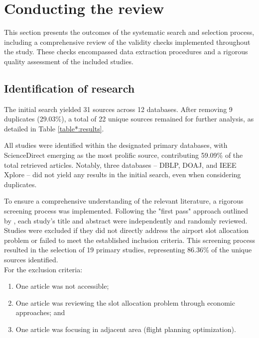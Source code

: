 \section{Conducting the review}
\label{section:Conducting}
This section presents the outcomes of the systematic search and selection process, including a comprehensive review of the validity checks implemented throughout the study. These checks encompassed data extraction procedures and a rigorous quality assessment of the included studies.

\subsection{Identification of research}

The initial search yielded 31 sources across 12 databases. After removing 9 duplicates (29.03\%), a total of 22 unique sources remained for further analysis, as detailed in Table \ref{table*:results}.



All studies were identified within the designated primary databases, with ScienceDirect emerging as the most prolific source, contributing 59.09\% of the total retrieved articles. Notably, three databases – \acrshort{DBLP}, \acrshort{DOAJ}, and IEEE Xplore – did not yield any results in the initial search, even when considering duplicates.

To ensure a comprehensive understanding of the relevant literature, a rigorous screening process was implemented. Following the "first pass" approach outlined by , each study's title and abstract were independently and randomly reviewed. Studies were excluded if they did not directly address the airport slot allocation problem or failed to meet the established inclusion criteria. This screening process resulted in the selection of 19 primary studies, representing 86.36\% of the unique sources identified.
\\

For the exclusion criteria: 
\begin{enumerate}
    \item One article was not accessible;
    \item One article was reviewing the slot allocation problem through economic approaches; and
    \item One article was focusing in adjacent area (flight planning optimization).
\end{enumerate}

